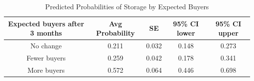 \begin{table}[H]
\centering
\caption{Predicted Probabilities of Storage by Expected Buyers} 
\begin{tabular}{ccccc}
  \hline
Expected buyers after 3 months & Avg Probability & SE & 95\% CI lower & 95\% CI upper \\ 
  \hline
No change & 0.211 & 0.032 & 0.148 & 0.273 \\ 
  Fewer buyers & 0.259 & 0.042 & 0.178 & 0.341 \\ 
  More buyers & 0.572 & 0.064 & 0.446 & 0.698 \\ 
   \hline
\end{tabular}
\label{tab:predicted_probs}
\end{table}
